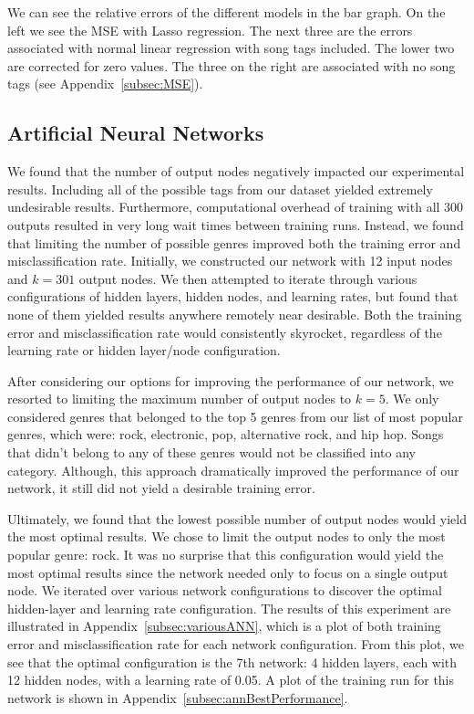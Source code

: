 \documentclass[12pt]{article}
\begin{document}
We can see the relative errors of the different models in the bar graph. On the left we see the MSE with Lasso regression. The next three are the errors associated with normal linear regression with song tags included. The lower two are corrected for zero values. The three on the right are associated with no song tags (see Appendix~\ref{subsec:MSE}).
\subsection{Artificial Neural Networks}
\label{subsec:annResults}
We found that the number of output nodes negatively impacted our experimental results. Including all of the possible tags from our dataset yielded extremely undesirable results. Furthermore, computational overhead of training with all 300 outputs resulted in very long wait times between training runs. Instead, we found that limiting the number of possible genres improved both the training error and misclassification rate. Initially, we constructed our network with 12 input nodes and $k = 301$ output nodes. We then attempted to iterate through various configurations of hidden layers, hidden nodes, and learning rates, but found that none of them yielded results anywhere remotely near desirable. Both the training error and misclassification rate would consistently skyrocket, regardless of the learning rate or hidden layer/node configuration.

After considering our options for improving the performance of our network, we resorted to limiting the maximum number of output nodes to $k = 5$. We only considered genres that belonged to the top 5 genres from our list of most popular genres, which were: rock, electronic, pop, alternative rock, and hip hop. Songs that didn't belong to any of these genres would not be classified into any category. Although, this approach dramatically improved the performance of our network, it still did not yield a desirable training error.

Ultimately, we found that the lowest possible number of output nodes would yield the most optimal results. We chose to limit the output nodes to only the most popular genre: rock. It was no surprise that this configuration would yield the most optimal results since the network needed only to focus on a single output node. We iterated over various network configurations to discover the optimal hidden-layer and learning rate configuration. The results of this experiment are illustrated in Appendix~\ref{subsec:variousANN}, which is a plot of both training error and misclassification rate for each network configuration. From this plot, we see that the optimal configuration is the 7th network: 4 hidden layers, each with 12 hidden nodes, with a learning rate of 0.05. A plot of the training run for this network is shown in Appendix~\ref{subsec:annBestPerformance}.
\end{document}
